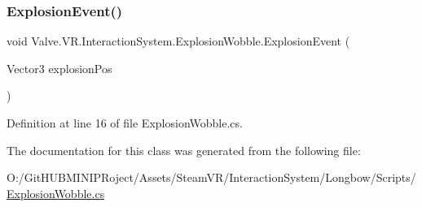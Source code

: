 \subsubsection{\texorpdfstring{ExplosionEvent()}{ExplosionEvent()}}
{\footnotesize\ttfamily void Valve.\+V\+R.\+Interaction\+System.\+Explosion\+Wobble.\+Explosion\+Event (\begin{DoxyParamCaption}\item[{Vector3}]{explosion\+Pos }\end{DoxyParamCaption})}



Definition at line 16 of file Explosion\+Wobble.\+cs.



The documentation for this class was generated from the following file\+:\begin{DoxyCompactItemize}
\item 
O\+:/\+Git\+H\+U\+B\+M\+I\+N\+I\+P\+Roject/\+Assets/\+Steam\+V\+R/\+Interaction\+System/\+Longbow/\+Scripts/\mbox{\hyperlink{_explosion_wobble_8cs}{Explosion\+Wobble.\+cs}}\end{DoxyCompactItemize}

